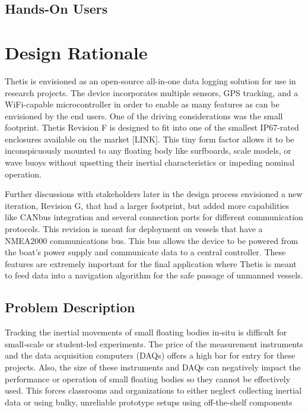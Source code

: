 \subsection{Hands-On Users} \label{ssec:hands_on_users}

\section{Design Rationale} \label{sec:design_rationale}
Thetis is envisioned as an open-source all-in-one data logging solution for use in research projects.
The device incorporates multiple sensors, GPS tracking, and a WiFi-capable microcontroller in order to enable as many features as can be envisioned by the end users.
One of the driving considerations was the small footprint.
Thetis Revision F is designed to fit into one of the smallest IP67-rated enclosures available on the market [LINK].  
This tiny form factor allows it to be inconspicuously mounted to any floating body like surfboards, scale models, or wave buoys without upsetting their inertial characteristics or impeding nominal operation.

Further discussions with stakeholders later in the design process envisioned a new iteration, Revision G, that had a larger footprint, but added more capabilities like CANbus integration and several connection ports for different communication protocols.
This revision is meant for deployment on vessels that have a NMEA2000 communications bus.
This bus allows the device to be powered from the boat's power supply and communicate data to a central controller.
These features are extremely important for the final application where Thetis is meant to feed data into a navigation algorithm for the safe passage of unmanned vessels.

\subsection{Problem Description} \label{ssec:problem_desc}
Tracking the inertial movements of small floating bodies in-situ is difficult for small-scale or student-led experiments.
The price of the measurement instruments and the data acquisition computers (DAQs) offers a high bar for entry for these projects.
Also, the size of these instruments and DAQs can negatively impact the performance or operation of small floating bodies so they cannot be effectively used.
This forces classrooms and organizations to either neglect collecting inertial data or using bulky, unreliable prototype setups using off-the-shelf components

